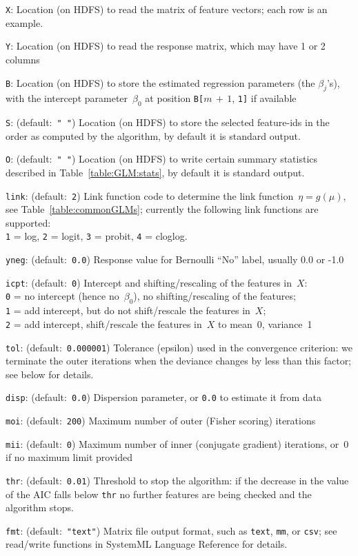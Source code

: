 \smallskip
{}
\begin{Description}
	\item[{\tt X}:]
	Location (on HDFS) to read the matrix of feature vectors; each row is
	an example.
	\item[{\tt Y}:]
	Location (on HDFS) to read the response matrix, which may have 1 or 2 columns
	\item[{\tt B}:]
	Location (on HDFS) to store the estimated regression parameters (the $\beta_j$'s), with the
	intercept parameter~$\beta_0$ at position {\tt B[}$m\,{+}\,1$, {\tt 1]} if available
	\item[{\tt S}:] (default:\mbox{ }{\tt " "})
	Location (on HDFS) to store the selected feature-ids in the order as computed by the algorithm,
	by default it is standard output.
	\item[{\tt O}:] (default:\mbox{ }{\tt " "})
	Location (on HDFS) to write certain summary statistics described in Table~\ref{table:GLM:stats},
	by default it is standard output. 
	\item[{\tt link}:] (default:\mbox{ }{\tt 2})
	Link function code to determine the link function~$\eta = g(\mu)$, see Table~\ref{table:commonGLMs}; currently the following link functions are supported: \\
	{\tt 1} = log,
	{\tt 2} = logit,
	{\tt 3} = probit,
	{\tt 4} = cloglog.
	\item[{\tt yneg}:] (default:\mbox{ }{\tt 0.0})
	Response value for Bernoulli ``No'' label, usually 0.0 or -1.0
	\item[{\tt icpt}:] (default:\mbox{ }{\tt 0})
	Intercept and shifting/rescaling of the features in~$X$:\\
	{\tt 0} = no intercept (hence no~$\beta_0$), no shifting/rescaling of the features;\\
	{\tt 1} = add intercept, but do not shift/rescale the features in~$X$;\\
	{\tt 2} = add intercept, shift/rescale the features in~$X$ to mean~0, variance~1
	\item[{\tt tol}:] (default:\mbox{ }{\tt 0.000001})
	Tolerance (epsilon) used in the convergence criterion: we terminate the outer iterations
	when the deviance changes by less than this factor; see below for details.
	\item[{\tt disp}:] (default:\mbox{ }{\tt 0.0})
	Dispersion parameter, or {\tt 0.0} to estimate it from data
	\item[{\tt moi}:] (default:\mbox{ }{\tt 200})
	Maximum number of outer (Fisher scoring) iterations
	\item[{\tt mii}:] (default:\mbox{ }{\tt 0})
	Maximum number of inner (conjugate gradient) iterations, or~0 if no maximum
	limit provided
	\item[{\tt thr}:] (default:\mbox{ }{\tt 0.01})
	Threshold to stop the algorithm: if the decrease in the value of the AIC falls below {\tt thr}
	no further features are being checked and the algorithm stops.
	\item[{\tt fmt}:] (default:\mbox{ }{\tt "text"})
	Matrix file output format, such as {\tt text}, {\tt mm}, or {\tt csv};
	see read/write functions in SystemML Language Reference for details.
\end{Description}


